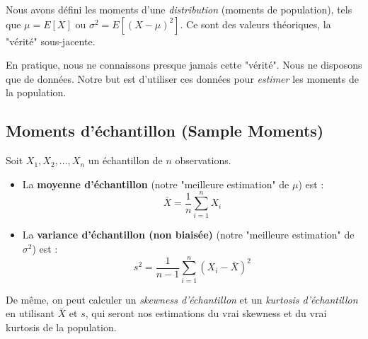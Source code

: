 Nous avons défini les moments d'une \textit{distribution} (moments de population), tels que $\mu = E[X]$ ou $\sigma^2 = E[(X-\mu)^2]$. Ce sont des valeurs théoriques, la "vérité" sous-jacente.

En pratique, nous ne connaissons presque jamais cette "vérité". Nous ne disposons que de données. Notre but est d'utiliser ces données pour \textit{estimer} les moments de la population.

\subsection{Moments d'échantillon (Sample Moments)}

\begin{definitionbox}
Soit $X_1, X_2, \dots, X_n$ un échantillon de $n$ observations.
\begin{itemize}
    \item La \textbf{moyenne d'échantillon} (notre "meilleure estimation" de $\mu$) est :
    $$ \bar{X} = \frac{1}{n} \sum_{i=1}^n X_i $$
    \item La \textbf{variance d'échantillon (non biaisée)} (notre "meilleure estimation" de $\sigma^2$) est :
    $$ s^2 = \frac{1}{n-1} \sum_{i=1}^n (X_i - \bar{X})^2 $$
\end{itemize}
De même, on peut calculer un \textit{skewness d'échantillon} et un \textit{kurtosis d'échantillon} en utilisant $\bar{X}$ et $s$, qui seront nos estimations du vrai skewness et du vrai kurtosis de la population.
\end{definitionbox}

